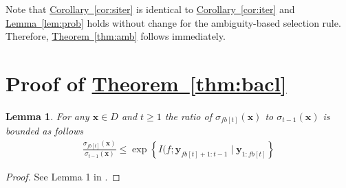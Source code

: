 \documentclass{article}
\def\*#1{\bm{#1}}
\newcommand{\theoremref}[1]{\hyperref[#1]{\mbox{Theorem~\ref*{#1}}}}
\newcommand{\lemmaref}[1]{\hyperref[#1]{\mbox{Lemma~\ref*{#1}}}}
\newcommand{\corref}[1]{\hyperref[#1]{\mbox{Corollary~\ref*{#1}}}}
\newtheorem{lemma}{Lemma}
\begin{document}
Note that \corref{cor:siter} is identical to \corref{cor:iter} and
\lemmaref{lem:prob} holds without change for the ambiguity-based selection
rule. Therefore, \theoremref{thm:amb} follows immediately.

\section{Proof of \theoremref{thm:bacl}} \label{sect:app_bacl}
\begin{lemma}
\label{lem:cmi}
For any $\*x \in D$ and $t \geq 1$
the ratio of $\sigma_{fb[t]}(\*x)$ to $\sigma_{t-1}(\*x)$ is bounded
as follows
\begin{align*}
\frac{\sigma_{fb[t]}(\*x)}{\sigma_{t-1}(\*x)} \leq \exp\left\{I(f; \*y_{fb[t]+1:t-1} \mid \*y_{1:fb[t]}\right\}
\end{align*}
\end{lemma}
\begin{proof}
See Lemma 1 in \cite{desautels2012}.
\end{proof}
\end{document}
